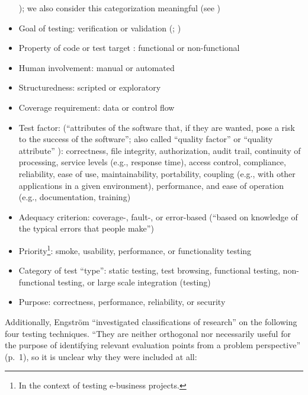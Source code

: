 \begin{itemize}
          \citealp[p.~53]{Patton2006}); we also consider this categorization
          meaningful (see )
    \item Goal of testing: verification or validation
          (\citealp[p.~214]{KuļešovsEtAl2013}; \citealp[pp.~69-70]{Perry2006})
    \item Property of code \citep[p.~213]{KuļešovsEtAl2013} or test target
          \citep[pp.~4-5]{Kam2008}: functional or non-functional
    \item Human involvement: manual or automated
          \citep[p.~214]{KuļešovsEtAl2013}
    \item Structuredness: scripted or exploratory
          \citep[p.~214]{KuļešovsEtAl2013}
    \item Coverage requirement: data or control flow \citep[pp.~4-5]{Kam2008}
    \item Test factor: (``attributes of the software that, if they are wanted,
          pose a risk to the success of the software''; also called ``quality
          factor'' or ``quality attribute'' \citep[p.~40]{Perry2006}):
          correctness, file integrity, authorization, audit trail, continuity
          of processing, service levels (e.g., response time), access control,
          compliance, reliability, ease of use, maintainability, portability,
          coupling (e.g., with other applications in a given environment),
          performance, and ease of operation (e.g., documentation, training)
          \citep[pp.~40-41]{Perry2006}
    \item Adequacy criterion: coverage-, fault-, or error-based
          (``based on knowledge of the typical errors that people make'')
          \citep[pp.~398-399]{vanVliet2000}
    \item Priority\footnote{In the context of testing e-business projects.}:
          smoke, usability, performance, or functionality testing
          \citep[p.~12]{Gerrard2000a}
    \item Category of test ``type'': static testing,
          test browsing, functional testing, non-functional testing, or large
          scale integration (testing) \citep[p.~12]{Gerrard2000a}
    \item Purpose: correctness, performance, reliability, or security
          \citep{Pan1999}
\end{itemize}

Additionally, Engström ``investigated classifications of research''
\citep[p.~1]{engström_mapping_2015} on the following four testing techniques.
``They are neither orthogonal nor necessarily useful for the purpose of
identifying relevant evaluation points from a problem perspective'' (p.~1), so
it is unclear why they were included at all:

